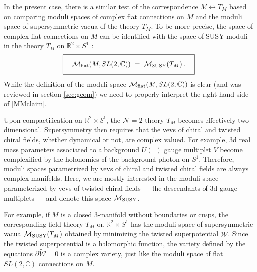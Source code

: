 \documentclass[hyper,letterpaper]{JHEP3}
\numberwithin{equation}{section}
\newcommand{\be}{\begin{equation}}
\newcommand{\ee}{\end{equation}}
\newcommand{\R}{{\mathbb R}}
\newcommand{\C}{{\mathbb C}}
\newcommand{\CM}{\mathcal{M}}
\newcommand{\CN}{\mathcal{N}}
\newcommand{\CW}{\mathcal{W}}
\begin{document}
In the present case, there is a similar test of the correspondence $M  \longleftrightarrow T_M$
based on comparing moduli spaces of complex flat connections on $M$ and the moduli space
of supersymmetric vacua of the theory $T_M$. To be more precise, the space of complex flat connections on $M$
can be identified with the space of SUSY moduli in the theory $T_M$ on $\R^2 \times S^1$ \cite{DGH}:
\be
\boxed{\phantom{\int}
\CM_{{\rm flat}} (M,SL(2,\C)) \; = \; \CM_{{\rm SUSY}} (T_M)\,.
\phantom{\int}}
\label{MMclaim}
\ee
While the definition of the moduli space $\CM_{{\rm flat}} (M,SL(2,\C))$ is clear (and was reviewed in section \ref{sec:geom})
we need to properly interpret the right-hand side of \eqref{MMclaim}.

Upon compactification on $\R^2\times S^1$, the $\CN=2$ theory $T_M$ becomes effectively two-dimensional. Supersymmetry then requires that the vevs of chiral and twisted chiral fields, whether dynamical or not, are complex valued. For example, 3d real mass parameters associated to a background $U(1)$ gauge multiplet $V$ become complexified by the holonomies of the background photon on $S^1$. Therefore, moduli spaces parametrized by vevs of chiral and twisted chiral fields are always complex manifolds.
Here, we are mostly interested in the moduli space parameterized by vevs of twisted chiral fields --- the descendants of 3d gauge multiplets --- and denote this space $\CM_{\rm SUSY}$.




For example, if $M$ is a closed 3-manifold without boundaries or cusps, the corresponding field theory $T_M$
on $\R^2 \times S^1$ has the moduli space of supersymmetric vacua $\CM_{{\rm SUSY}} (T_M)$
obtained by minimizing the twisted superpotential $\widetilde{\CW}$.
Since the twisted superpotential is a holomorphic function, the variety defined by
the equations $\partial \widetilde{\CW}=0$ is a complex variety, just like the moduli space
of flat $SL(2,\C)$ connections on $M$.
\end{document}
